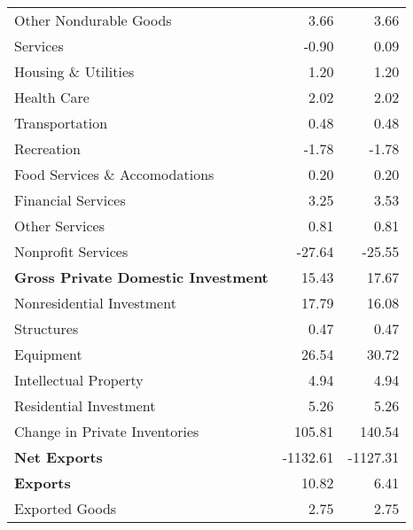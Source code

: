 \documentclass[11pt, letterpaper]{article}\usepackage[]{graphicx}\usepackage[]{color}
\begin{document}
\begin{table}[H]
\begin{tabular}{lrr}
  \hspace{24mm}  Other Nondurable Goods & 3.66 & 3.66 \\ 
  \hspace{8mm}  Services & -0.90 & 0.09 \\ 
  \hspace{16mm}  Housing \& Utilities & 1.20 & 1.20 \\ 
  \hspace{16mm}  Health Care & 2.02 & 2.02 \\ 
  \hspace{16mm}  Transportation & 0.48 & 0.48 \\ 
  \hspace{16mm}  Recreation & -1.78 & -1.78 \\ 
  \hspace{16mm}  Food Services \& Accomodations & 0.20 & 0.20 \\ 
  \hspace{16mm}  Financial Services & 3.25 & 3.53 \\ 
  \hspace{16mm}  Other Services & 0.81 & 0.81 \\ 
  \hspace{16mm}  Nonprofit Services & -27.64 & -25.55 \\ 
  \hspace{0mm} \textbf{Gross Private Domestic Investment} & 15.43 & 17.67 \\ 
  \hspace{8mm}  Nonresidential Investment & 17.79 & 16.08 \\ 
  \hspace{16mm}  Structures & 0.47 & 0.47 \\ 
  \hspace{16mm}  Equipment & 26.54 & 30.72 \\ 
  \hspace{16mm}  Intellectual Property & 4.94 & 4.94 \\ 
  \hspace{8mm}  Residential Investment & 5.26 & 5.26 \\ 
  \hspace{8mm}  Change in Private Inventories & 105.81 & 140.54 \\ 
  \hspace{0mm} \textbf{Net Exports} & -1132.61 & -1127.31 \\ 
  \hspace{0mm} \textbf{Exports} & 10.82 & 6.41 \\ 
  \hspace{8mm}  Exported Goods & 2.75 & 2.75 \\ 

\end{tabular}
\end{table}
\end{document}

